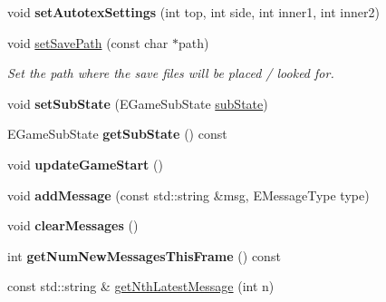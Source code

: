 \begin{DoxyCompactItemize}
\item 
\hypertarget{classGame_a3a7c937ca508ce8a3125b1f31af848af}{
void {\bfseries set\-Autotex\-Settings} (int top, int side, int inner1, int inner2)}
\label{d9/d68/classGame_a3a7c937ca508ce8a3125b1f31af848af}

\item 
\hypertarget{classGame_acd756e9c2755fa073a14e2fef6d9ee46}{
void \hyperlink{classGame_acd756e9c2755fa073a14e2fef6d9ee46}{set\-Save\-Path} (const char $\ast$path)}
\label{d9/d68/classGame_acd756e9c2755fa073a14e2fef6d9ee46}

\begin{DoxyCompactList}\small\item\em \-Set the path where the save files will be placed / looked for. \end{DoxyCompactList}\item 
\hypertarget{classGame_abcd390fac67cb896cd339f035aa91e25}{
void {\bfseries set\-Sub\-State} (\-E\-Game\-Sub\-State \hyperlink{classGame_a114e62b3579e9e001600447a623a8ed4}{sub\-State})}
\label{d9/d68/classGame_abcd390fac67cb896cd339f035aa91e25}

\item 
\hypertarget{classGame_a3116d1082b7a6e055e2d33f0a69696a0}{
\-E\-Game\-Sub\-State {\bfseries get\-Sub\-State} () const }
\label{d9/d68/classGame_a3116d1082b7a6e055e2d33f0a69696a0}

\item 
\hypertarget{classGame_ad5c9bdfb46133c7b4738c3a63eb8f969}{
void {\bfseries update\-Game\-Start} ()}
\label{d9/d68/classGame_ad5c9bdfb46133c7b4738c3a63eb8f969}

\item 
\hypertarget{classGame_af1665a8a48d7e99bdff276dc6c0e255a}{
void {\bfseries add\-Message} (const std\-::string \&msg, \-E\-Message\-Type type)}
\label{d9/d68/classGame_af1665a8a48d7e99bdff276dc6c0e255a}

\item 
\hypertarget{classGame_aa59280586bb4da9b55fa37d8a9292b34}{
void {\bfseries clear\-Messages} ()}
\label{d9/d68/classGame_aa59280586bb4da9b55fa37d8a9292b34}

\item 
\hypertarget{classGame_ab2f6eb9dbed5ed2586281dd0d4060f5a}{
int {\bfseries get\-Num\-New\-Messages\-This\-Frame} () const }
\label{d9/d68/classGame_ab2f6eb9dbed5ed2586281dd0d4060f5a}

\item 
\hypertarget{classGame_adc3710924fd3edf6074f1c914b7497eb}{
const std\-::string \& \hyperlink{classGame_adc3710924fd3edf6074f1c914b7497eb}{get\-Nth\-Latest\-Message} (int n)}
\label{d9/d68/classGame_adc3710924fd3edf6074f1c914b7497eb}


\end{DoxyCompactItemize}
